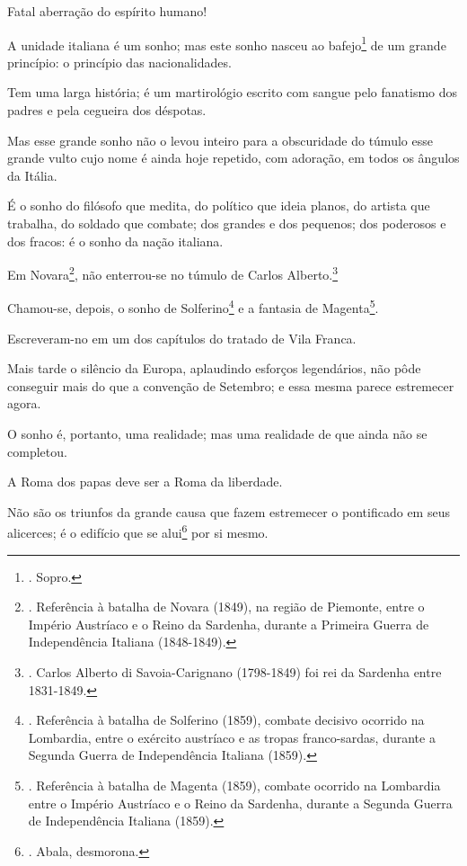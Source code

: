 Fatal aberração do espírito humano!

A unidade italiana é um sonho; mas este sonho nasceu ao
bafejo\footnote{. Sopro.} de um grande princípio: o princípio das
nacionalidades.

Tem uma larga história; é um martirológio escrito com sangue pelo
fanatismo dos padres e pela cegueira dos déspotas.

Mas esse grande sonho não o levou inteiro para a obscuridade do túmulo
esse grande vulto cujo nome é ainda hoje repetido, com adoração, em
todos os ângulos da Itália.

É o sonho do filósofo que medita, do político que ideia planos, do
artista que trabalha, do soldado que combate; dos grandes e dos
pequenos; dos poderosos e dos fracos: é o sonho da nação italiana.

Em Novara\footnote{. Referência à batalha de Novara (1849), na região de
  Piemonte, entre o Império Austríaco e o Reino da Sardenha, durante a
  Primeira Guerra de Independência Italiana (1848-1849).}, não
enterrou-se no túmulo de Carlos Alberto.\footnote{. Carlos Alberto di
  Savoia-Carignano (1798-1849) foi rei da Sardenha entre 1831-1849.}

Chamou-se, depois, o sonho de Solferino\footnote{. Referência à batalha
  de Solferino (1859), combate decisivo ocorrido na Lombardia, entre o
  exército austríaco e as tropas franco-sardas, durante a Segunda Guerra
  de Independência Italiana (1859).} e a fantasia de Magenta\footnote{.
  Referência à batalha de Magenta (1859), combate ocorrido na Lombardia
  entre o Império Austríaco e o Reino da Sardenha, durante a Segunda
  Guerra de Independência Italiana (1859).}.

Escreveram-no em um dos capítulos do tratado de Vila Franca.

Mais tarde o silêncio da Europa, aplaudindo esforços legendários, não
pôde conseguir mais do que a convenção de Setembro; e essa mesma parece
estremecer agora.

O sonho é, portanto, uma realidade; mas uma realidade de que ainda não
se completou.

A Roma dos papas deve ser a Roma da liberdade.

Não são os triunfos da grande causa que fazem estremecer o pontificado
em seus alicerces; é o edifício que se alui\footnote{. Abala, desmorona.}
por si mesmo.

